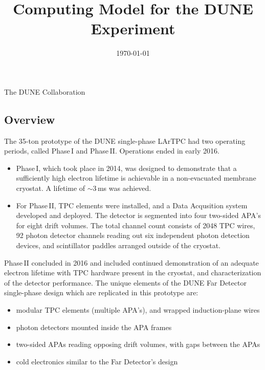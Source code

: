 \documentclass[12pt]{article}
\begin{document}

\title{Computing Model for the DUNE Experiment}

\date{\today}

\maketitle

\centerline{The DUNE Collaboration}



\vspace{2cm}




\newpage
%

\newpage
\tableofcontents
\newpage
\listoftables
\newpage
\listoffigures


\newpage

\subsection{Overview}
The 35-ton prototype of the DUNE single-phase LArTPC had two operating periods, called Phase\,I and Phase\,II.
Operations ended in early 2016.
\begin{itemize}

\item Phase\,I, which took place in 2014, was designed to demonstrate that a sufficiently high electron
lifetime is achievable in a non-evacuated membrane cryostat. A lifetime of $\sim$3\,ms was achieved.

\item For Phase\,II, TPC elements were installed, and a Data Acqusition system developed and deployed. 
The detector is segmented into four two-sided APA's for eight drift volumes. The total channel count
consists of 2048 TPC wires, 92 photon detector channels reading out six independent photon
detection devices, and scintillator paddles arranged outside of the cryostat.

\end{itemize}

\noindent
Phase\,II concluded in 2016 and included continued demonstration of an adequate electron
lifetime with TPC hardware present in the cryostat, and characterization of the detector performance.
The unique elements of the DUNE Far Detector single-phase design which are replicated in this prototype are:
\begin{itemize}
\item  modular TPC elements (multiple APA's), and wrapped induction-plane wires
\item photon detectors mounted inside the APA frames
\item two-sided APAs reading opposing drift volumes, with gaps between the APAs
\item cold electronics similar to the Far Detector's design
\end{itemize}
\end{document}
